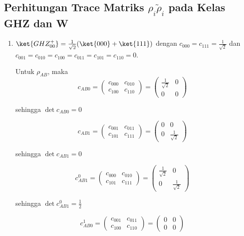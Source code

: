 \subsection{Perhitungan Trace Matriks $\rho_i\tilde{\rho}_i$ pada Kelas GHZ dan W}
\begin{enumerate}	
	\item {$\ket{GHZ_{00}^+}=\frac{1}{\sqrt{2}}(\ket{000}+\ket{111})$}
	dengan $c_{000}=c_{111}=\frac{1}{\sqrt{2}}$ dan $c_{001}=c_{010}=c_{100}=c_{011}=c_{101}=c_{110}=0$.
	
	Untuk $\rho_{AB}$, maka
	\begin{equation}
		c_{AB0}=
		\begin{pmatrix}
			c_{000} & c_{010} \\
			c_{100} & c_{110}
		\end{pmatrix}=
		\begin{pmatrix}
			\frac{1}{\sqrt{2}} & 0 \\
			0 & 0
		\end{pmatrix}
	\end{equation}
	
	sehingga $\det c_{AB0} = 0$
	
	\begin{equation}
		c_{AB1}=
		\begin{pmatrix}
			c_{001} & c_{011} \\
			c_{101} & c_{111}
		\end{pmatrix}=
		\begin{pmatrix}
			0 & 0 \\
			0 & \frac{1}{\sqrt{2}}
		\end{pmatrix}
	\end{equation}
	
	sehingga $\det c_{AB1} = 0$
	
	\begin{equation}
		c_{AB1}^0=
		\begin{pmatrix}
			c_{000} & c_{010} \\
			c_{101} & c_{111}
		\end{pmatrix}=
		\begin{pmatrix}
			\frac{1}{\sqrt{2}} & 0 \\
			0 & \frac{1}{\sqrt{2}}
		\end{pmatrix}
	\end{equation}
	
	sehingga $\det c_{AB1}^0 = \frac{1}{2}$
	
	\begin{equation}
		c_{AB0}^1=
		\begin{pmatrix}
			c_{001} & c_{011} \\
			c_{100} & c_{110}
		\end{pmatrix}=
		\begin{pmatrix}
			0 & 0 \\
			0 & 0
		\end{pmatrix}
	\end{equation}
	

\end{enumerate}
